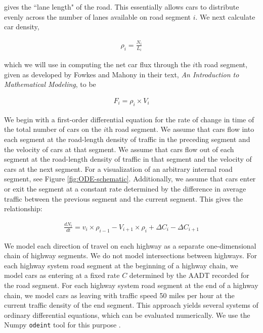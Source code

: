 gives the ``lane length" of the road.  This essentially allows cars to distribute evenly across the number of lanes available on road segment $i$.  We next calculate car density,

\begin{align}
\rho_i = \frac{N_i}{L_i} 
\end{align}

which we will use in computing the net car flux through the $i$th road segment, given as developed by Fowkes and Mahony in their text, \textit{An Introduction to Mathematical Modeling}, to be

\begin{align}
F_i = \rho_i \times V_i
\end{align}

We begin with a first-order differential equation for the rate of change in time of the total number of cars on the $i$th road segment. We assume that cars flow into each segment at the road-length density of traffic in the preceding segment and the  velocity of cars at that segment. We assume that cars flow out of each segment at the road-length density of traffic in that segment and the velocity of cars at the next segment. For a visualization of an arbitrary internal road segment, see Figure \ref{fig:ODE-schematic}. Additionally, we assume that cars enter or exit the segment at a constant rate determined by the difference in average traffic between the previous segment and the current segment. This gives the relationship:

\begin{align}
\frac{dN_i}{dt} = v_{i} \times \rho_{i-1} - V_{i+1} \times \rho_{i} + \Delta C_i - \Delta C_{i + 1}
\end{align}



We model each direction of travel on each highway as a separate one-dimensional chain of highway segments. We do not model intersections between highways. For each highway system road segment at the beginning of a highway chain, we model cars as entering at a fixed rate $C$ determined by the AADT recorded for the road segment. For each highway system road segment at the end of a highway chain, we model cars as leaving with traffic speed 50 miles per hour at the current traffic density of the end segment. This approach yields several systems of ordinary differential equations, which can be evaluated numerically. We use the Numpy \texttt{odeint} tool for this purpose \cite{Jones2001SciPy:Python}. 

